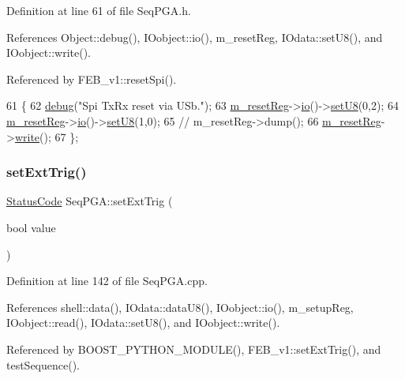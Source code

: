 Definition at line 61 of file Seq\+P\+G\+A.\+h.



References Object\+::debug(), I\+Oobject\+::io(), m\+\_\+reset\+Reg, I\+Odata\+::set\+U8(), and I\+Oobject\+::write().



Referenced by F\+E\+B\+\_\+v1\+::reset\+Spi().


\begin{DoxyCode}
61                   \{
62     \hyperlink{classObject_aac010553f022165573714b7014a15f0d}{debug}(\textcolor{stringliteral}{"Spi TxRx reset via USb."});
63     \hyperlink{classSeqPGA_a8c519e98b992ab872622e95dae4461d8}{m\_resetReg}->\hyperlink{classIOobject_af04fb94137c3d86849f478ac5afab5d1}{io}()->\hyperlink{classIOdata_a6c4fb2f2af01889ada889c2b7aceb24d}{setU8}(0,2);
64     \hyperlink{classSeqPGA_a8c519e98b992ab872622e95dae4461d8}{m\_resetReg}->\hyperlink{classIOobject_af04fb94137c3d86849f478ac5afab5d1}{io}()->\hyperlink{classIOdata_a6c4fb2f2af01889ada889c2b7aceb24d}{setU8}(1,0);
65     \textcolor{comment}{//    m\_resetReg->dump();}
66     \hyperlink{classSeqPGA_a8c519e98b992ab872622e95dae4461d8}{m\_resetReg}->\hyperlink{classIOobject_a9f6984bc9f0fadcf800f1be2523ac744}{write}();
67   \};
\end{DoxyCode}
\mbox{\label{classSeqPGA_a9744b6cff04738474556cc2153af19de}} 
\subsubsection{\texorpdfstring{set\+Ext\+Trig()}{setExtTrig()}}
{\footnotesize\ttfamily \hyperlink{classStatusCode}{Status\+Code} Seq\+P\+G\+A\+::set\+Ext\+Trig (\begin{DoxyParamCaption}\item[{bool}]{value }\end{DoxyParamCaption})}



Definition at line 142 of file Seq\+P\+G\+A.\+cpp.



References shell\+::data(), I\+Odata\+::data\+U8(), I\+Oobject\+::io(), m\+\_\+setup\+Reg, I\+Oobject\+::read(), I\+Odata\+::set\+U8(), and I\+Oobject\+::write().



Referenced by B\+O\+O\+S\+T\+\_\+\+P\+Y\+T\+H\+O\+N\+\_\+\+M\+O\+D\+U\+L\+E(), F\+E\+B\+\_\+v1\+::set\+Ext\+Trig(), and test\+Sequence().


